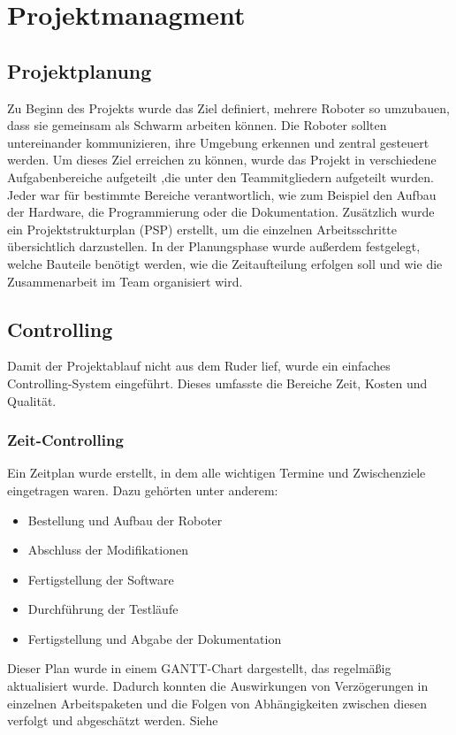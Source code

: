 \section{Projektmanagment}
\label{subsec:projektmanagment}
%
\subsection{Projektplanung}
%

Zu Beginn des Projekts wurde das Ziel definiert, mehrere Roboter so umzubauen, dass sie gemeinsam als Schwarm arbeiten können. Die Roboter sollten untereinander kommunizieren, ihre Umgebung erkennen und zentral gesteuert werden. Um dieses Ziel erreichen zu können, wurde das Projekt in verschiedene Aufgabenbereiche aufgeteilt
,die unter den Teammitgliedern aufgeteilt wurden. Jeder war für bestimmte Bereiche verantwortlich, wie zum Beispiel den Aufbau der Hardware, die Programmierung oder die Dokumentation.
Zusätzlich wurde ein Projektstrukturplan (PSP) erstellt, um die einzelnen Arbeitsschritte übersichtlich darzustellen.
In der Planungsphase wurde außerdem festgelegt, welche Bauteile benötigt werden, wie die Zeitaufteilung erfolgen soll und wie die Zusammenarbeit im Team organisiert wird.
\subsection{Controlling}
Damit der Projektablauf nicht aus dem Ruder lief, wurde ein einfaches Controlling-System eingeführt. Dieses umfasste die Bereiche Zeit, Kosten und Qualität.
\subsubsection{Zeit-Controlling}
Ein Zeitplan wurde erstellt, in dem alle wichtigen Termine und Zwischenziele eingetragen waren.
Dazu gehörten unter anderem:
\begin{itemize}
    \item Bestellung und Aufbau der Roboter
    \item Abschluss der Modifikationen
    \item Fertigstellung der Software
    \item Durchführung der Testläufe
    \item Fertigstellung und Abgabe der Dokumentation
\end{itemize}
Dieser Plan wurde in einem GANTT-Chart dargestellt, das regelmäßig aktualisiert wurde.
Dadurch konnten die Auswirkungen von Verzögerungen in einzelnen Arbeitspaketen und die Folgen von Abhängigkeiten zwischen diesen verfolgt und abgeschätzt werden.
Siehe %
